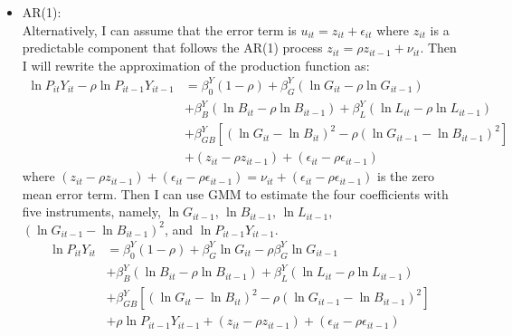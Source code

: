 \begin{itemize}
    \item AR(1):\\
    Alternatively, I can assume that the error term is $u_{it} = z_{it} + \epsilon_{it}$ where $z_{it}$ is a predictable component that follows the AR(1) process $z_{it} = \rho z_{it-1} + \nu_{it}$. Then I will rewrite the approximation of the production function as:
    \begin{equation*}
      \begin{split}
        \ln P_{it}Y_{it} - \rho \ln P_{it-1}Y_{it-1} & = \beta_0^Y(1-\rho) + \beta_G^Y (\ln G_{it} - \rho \ln G_{it-1}) \\
        &  + \beta_B^Y (\ln B_{it} - \rho \ln B_{it-1}) + \beta_L^Y (\ln L_{it} - \rho \ln L_{it-1}) \\
        & + \beta_{GB}^Y [(\ln G_{it} -  \ln B_{it} )^2 - \rho(\ln G_{it-1} - \ln B_{it-1})^2]\\
        & + (z_{it} - \rho z_{it-1}) + (\epsilon_{it} - \rho \epsilon_{it-1})
      \end{split}
    \end{equation*}
    where $(z_{it} - \rho z_{it-1}) + (\epsilon_{it} - \rho \epsilon_{it-1}) = \nu_{it} + (\epsilon_{it} - \rho \epsilon_{it-1})$ is the zero mean error term. Then I can use GMM to estimate the four coefficients with five instruments, namely, $\ln G_{it-1}$, $\ln B_{it-1}$, $\ln L_{it-1}$, $(\ln G_{it-1} - \ln B_{it-1})^2$, and $\ln P_{it-1}Y_{it-1}$.
    \begin{equation*}
        \begin{split}
          \ln P_{it}Y_{it} & = \beta_0^Y(1-\rho) + \beta_G^Y \ln G_{it} - \rho\beta_G^Y \ln G_{it-1} \\
          &  + \beta_B^Y (\ln B_{it} - \rho \ln B_{it-1}) + \beta_L^Y (\ln L_{it} - \rho \ln L_{it-1}) \\
          & + \beta_{GB}^Y [(\ln G_{it} -  \ln B_{it} )^2 - \rho(\ln G_{it-1} - \ln B_{it-1})^2]\\
          & + \rho \ln P_{it-1}Y_{it-1}  + (z_{it} - \rho z_{it-1}) + (\epsilon_{it} - \rho \epsilon_{it-1})
        \end{split}
      \end{equation*}
\end{itemize}

